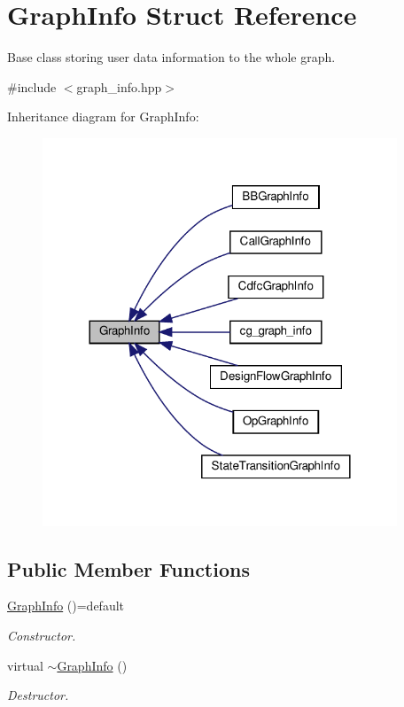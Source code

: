 \hypertarget{structGraphInfo}{}\section{Graph\+Info Struct Reference}
\label{structGraphInfo}


Base class storing user data information to the whole graph.  




{\ttfamily \#include $<$graph\+\_\+info.\+hpp$>$}



Inheritance diagram for Graph\+Info\+:
\nopagebreak
\begin{figure}[H]
\begin{center}
\leavevmode
\includegraphics[width=300pt]{d4/d10/structGraphInfo__inherit__graph}
\end{center}
\end{figure}
\subsection*{Public Member Functions}
\begin{DoxyCompactItemize}
\item 
\hyperlink{structGraphInfo_a4e539fcf1c2889d54527cf5d49a0368a}{Graph\+Info} ()=default
\begin{DoxyCompactList}\small\item\em Constructor. \end{DoxyCompactList}\item 
virtual \hyperlink{structGraphInfo_a32f3aa11c3b38d6c0ceefbcda0e3c93c}{$\sim$\+Graph\+Info} ()
\begin{DoxyCompactList}\small\item\em Destructor. \end{DoxyCompactList}\end{DoxyCompactItemize}


